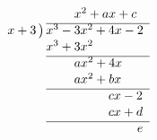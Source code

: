{\small$\begin{array}{r@{\,}l}
 & \phantom{x^3-{}}x^2+ax+c \\[1pt] \cline{2-2}
x+3\,\big) & x^3-3x^2+4x-2 \\[1pt]
 & x^3+3x^2 \\[1pt] \cline{2-2}
 & \phantom{x^3-{}}ax^2+4x \\[1pt]
 & \phantom{x^3-{}}ax^2+bx \\[1pt] \cline{2-2}
 & \phantom{x^3-3x^2+{}}cx-2 \\[1pt]
 & \phantom{x^3-3x^2+{}}cx+d \\[1pt] \cline{2-2}
 & \phantom{x^3-3x^2+4x+{}}e
\end{array}$}

